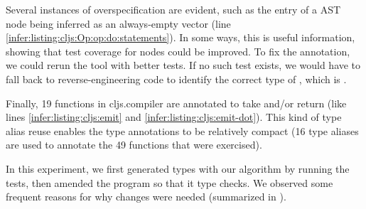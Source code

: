 Several instances of overspecification are evident,
such as the  entry of a  AST node being inferred as an always-empty vector
(line \ref{infer:listing:cljs:Op:op:do:statements}).
In some ways, this is useful information, showing that
test coverage for  nodes could be improved.
To fix the annotation, we could rerun the tool with better tests.
If no such test exists, we would have to fall back
to reverse-engineering code to identify the correct
type of , which is .

Finally, 19 functions in cljs.compiler are annotated to 
take and/or return  (like lines \ref{infer:listing:cljs:emit} and \ref{infer:listing:cljs:emit-dot}).
This kind of type alias reuse enables the type annotations
to be relatively compact (16 type aliases are used to annotate the
49 functions that were exercised).

%
%
%
%
%
%

\label{infer:sec:experiment2}

In this experiment, we first generated types with our algorithm
by running the tests, then amended the program so that it
type checks.
We observed some frequent reasons for why changes were needed
(summarized in ).

